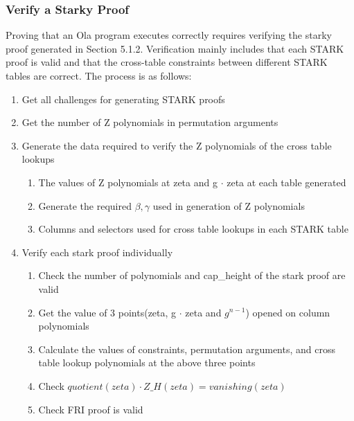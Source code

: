 \subsubsection{Verify a Starky Proof}\label{section: starky-verify-proof}

Proving that an Ola program executes correctly requires verifying the starky proof generated in Section 5.1.2. Verification mainly includes that each STARK proof is valid and that the cross-table constraints between different STARK tables are correct. The process is as follows:

\begin{enumerate}
    \item Get all challenges for generating STARK proofs
    \item Get the number of Z polynomials  in permutation arguments
    \item Generate the data required to verify the Z polynomials of the cross table lookups
        \begin{enumerate}
            \item The values of Z polynomials at zeta and g $\cdot$ zeta at each table generated
            \item Generate the required $\beta, \gamma$ used in generation of Z polynomials
            \item Columns and selectors used for cross table lookups in each STARK table
        \end{enumerate}
    \item Verify each stark proof individually
        \begin{enumerate}
            \item Check the number of polynomials and cap\_height of the stark proof are valid
            \item Get the value of 3 points(zeta, g $\cdot$ zeta and $g^{n-1}$) opened on column polynomials
            \item Calculate the values of constraints, permutation arguments, and cross table lookup polynomials at the above three points
            \item Check $quotient(zeta) \cdot Z\_H(zeta) = vanishing(zeta)$
            \item Check FRI proof is valid
        \end{enumerate}
\end{enumerate}
